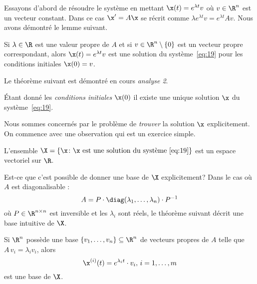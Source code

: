 Essayons d'abord de résoudre le système en mettant  $\x(t) = e^{\lambda t} v$ où $v \in \R^n$ est un vecteur constant. Dans ce cas $\x' = A\x$ se récrit comme   $\lambda e^{\lambda t}  v = e^{\lambda t} A v$. Nous avons démontré le lemme suivant. 

\begin{lemma}
  \label{thr:29}
  Si $\lambda \in \R$ est une valeur propre de $A$ et si $v \in \R^n \setminus \{0\}$ est un vecteur propre correspondant, alors $\x(t) = e^{\lambda t} v$ est  une solution du système~\eqref{eq:19} pour les conditions initiales $\x(0) = v$. 
\end{lemma}


Le théorème suivant est démontré en cours \emph{analyse 2}. 
\begin{theorem} 
  \label{thr:28}
  Étant donné les \emph{conditions initiales} $\x(0)$
  il existe une unique solution $\x$ du système~\eqref{eq:19}. 
\end{theorem}
Nous sommes concernés par le problème de \emph{trouver} la solution $\x$ explicitement. On commence avec une observation qui est un exercice simple. 

\begin{lemma}
  \label{lem:13}
  L'ensemble $\X = \{ \x \colon \x \text{ est une solution du système \eqref{eq:19}}\}$ est un espace vectoriel sur $\R$.  
\end{lemma}

Est-ce que c'est possible de donner  une base de $\X$ explicitement? Dans le cas où $A$ est diagonalisable : 
\begin{displaymath}
  A = P \cdot \diag(\lambda_1,\dots,\lambda_n) \cdot P^{-1} 
\end{displaymath}
où $P \in \R^{n \times n}$ est inversible et les  $\lambda_i$ sont réels, le théorème suivant décrit une base intuitive de $\X$.

\begin{theorem}
  \label{thr:30}
  Si $\R^n$ possède une base $\{v_1,\dots,v_n\} \subseteq \R^n$ de vecteurs propres de $A$ telle que $A \, v_i = \lambda_i v_i$, alors  
  \begin{displaymath}
    \x^{(i)}(t) = e^{\lambda_i t} \cdot v_i, \, i=1,\dots,m
  \end{displaymath}
est une base de $\X$. 
\end{theorem}

